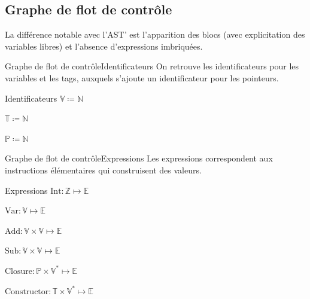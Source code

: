 \documentclass{beamer}
\begin{document}

\subsection{Graphe de flot de contrôle}

La différence notable avec l'AST' est l'apparition des blocs (avec explicitation des variables libres) et l'absence d'expressions imbriquées.

\begin{frame}{Graphe de flot de contrôle}{Identificateurs}
    On retrouve les identificateurs pour les variables et les tags, auxquels s'ajoute un identificateur pour les pointeurs.
    
    \begin{block}{Identificateurs}
        $\mathbb{V} \coloneqq \mathbb{N}$%

        $\mathbb{T} \coloneqq \mathbb{N}$%

        $\mathbb{P} \coloneqq \mathbb{N}$%
    \end{block}
\end{frame}

\begin{frame}{Graphe de flot de contrôle}{Expressions}
    Les expressions correspondent aux instructions élémentaires qui construisent des valeurs.
    
    \begin{block}{Expressions}
        $\text{Int} : \mathbb{Z} \mapsto \mathbb{E}$%

        $\text{Var} : \mathbb{V} \mapsto \mathbb{E}$%

        $\text{Add} : \mathbb{V} \times \mathbb{V} \mapsto \mathbb{E}$%

        $\text{Sub} : \mathbb{V} \times \mathbb{V} \mapsto \mathbb{E}$%

        $\text{Closure} : \mathbb{P} \times \mathbb{V}^{*} \mapsto \mathbb{E}$%

        $\text{Constructor} : \mathbb{T} \times \mathbb{V}^{*} \mapsto \mathbb{E}$%
    \end{block}
\end{frame}
\end{document}
